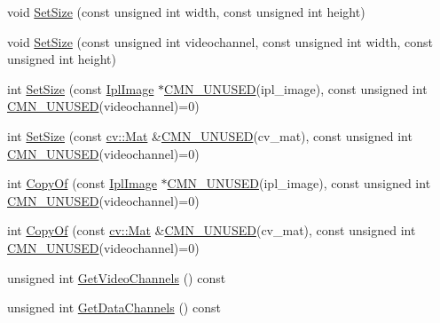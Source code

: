 \begin{DoxyCompactItemize}
\item 
void \hyperlink{classsvl_sample_image_custom_afd5680235e119e25aaa963ded5c48eaf}{Set\+Size} (const unsigned int width, const unsigned int height)
\item 
void \hyperlink{classsvl_sample_image_custom_a9f5e5b51372a642bb86b7f3a7ca18fac}{Set\+Size} (const unsigned int videochannel, const unsigned int width, const unsigned int height)
\item 
int \hyperlink{classsvl_sample_image_custom_a2cd2ed04b703eba1236882f90b17ae4a}{Set\+Size} (const \hyperlink{svl_types_8h_aa5a40a13021ba9708bfe921e18fdfa53}{Ipl\+Image} $\ast$\hyperlink{cmn_portability_8h_a021894e2626935fa2305434b1e893ff6}{C\+M\+N\+\_\+\+U\+N\+U\+S\+E\+D}(ipl\+\_\+image), const unsigned int \hyperlink{cmn_portability_8h_a021894e2626935fa2305434b1e893ff6}{C\+M\+N\+\_\+\+U\+N\+U\+S\+E\+D}(videochannel)=0)
\item 
int \hyperlink{classsvl_sample_image_custom_a5a87a82a4bf459e59489dded77e8d77a}{Set\+Size} (const \hyperlink{namespacecv_a60d81b54f4914bec4cc4a72ab77eb444}{cv\+::\+Mat} \&\hyperlink{cmn_portability_8h_a021894e2626935fa2305434b1e893ff6}{C\+M\+N\+\_\+\+U\+N\+U\+S\+E\+D}(cv\+\_\+mat), const unsigned int \hyperlink{cmn_portability_8h_a021894e2626935fa2305434b1e893ff6}{C\+M\+N\+\_\+\+U\+N\+U\+S\+E\+D}(videochannel)=0)
\item 
int \hyperlink{classsvl_sample_image_custom_a0a34cb5050fce85e6763eb7b01fa6a88}{Copy\+Of} (const \hyperlink{svl_types_8h_aa5a40a13021ba9708bfe921e18fdfa53}{Ipl\+Image} $\ast$\hyperlink{cmn_portability_8h_a021894e2626935fa2305434b1e893ff6}{C\+M\+N\+\_\+\+U\+N\+U\+S\+E\+D}(ipl\+\_\+image), const unsigned int \hyperlink{cmn_portability_8h_a021894e2626935fa2305434b1e893ff6}{C\+M\+N\+\_\+\+U\+N\+U\+S\+E\+D}(videochannel)=0)
\item 
int \hyperlink{classsvl_sample_image_custom_a62ff5d6430467d3a35c47577bb8ecc14}{Copy\+Of} (const \hyperlink{namespacecv_a60d81b54f4914bec4cc4a72ab77eb444}{cv\+::\+Mat} \&\hyperlink{cmn_portability_8h_a021894e2626935fa2305434b1e893ff6}{C\+M\+N\+\_\+\+U\+N\+U\+S\+E\+D}(cv\+\_\+mat), const unsigned int \hyperlink{cmn_portability_8h_a021894e2626935fa2305434b1e893ff6}{C\+M\+N\+\_\+\+U\+N\+U\+S\+E\+D}(videochannel)=0)
\item 
unsigned int \hyperlink{classsvl_sample_image_custom_a5e9b96c832ad4af214cada505f859bc2}{Get\+Video\+Channels} () const 
\item 
unsigned int \hyperlink{classsvl_sample_image_custom_a69f356f71fb518bd1b624cf9bde82e01}{Get\+Data\+Channels} () const 

\end{DoxyCompactItemize}
